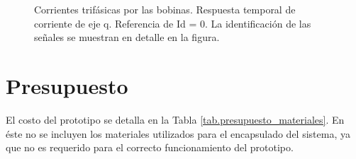 \documentclass{report}
\begin{document}
\begin{figure}[ht]
    \begin{center}
    \resizebox{10cm}{!}{\texttt{[image: 20191219\_170609\_664]}}
    \caption{Corrientes trifásicas por las bobinas. Respuesta temporal de corriente de eje q. Referencia de Id = 0. La identificación de las señales se muestran en detalle en la figura.}
    \label{fig.20191219_170609_664} 
    \end{center}
\end{figure}
\begin{comment}

\begin{table}[ht]
    \begin{minipage}{\textwidth}
    \begin{center}
    \begin{tabular}{|c|c|c|c|c|c|} \hline\hline\hline
    Canal & Color & Elemento & Amplitud (V) & Nº Espiras & Amperaje (A) \\ \hline
    1 & Amarillo & $I_{a}$ & 4.61 & 1 & 4.61 \\ \hline
    2 & Verde & $I_{b}$ & 4.69 & 1 & 4.69 \\ \hline   
    3 & Rosa & $I_{c}$ & 4.61 & 1 &  4.61\\ \hline
    6 \footnote{Medidas no disponibles}& Naranja & $I_{q}$ & - & - &  -\\ \hline
    9 \footnote{Medidas no disponibles}& Azul Oscuro & $I_{q}^{ref}$ & - & - & - \\ \hline


    \end{tabular}
    \end{center}
    \caption{Tabla con los datos de la Fig. \ref{fig.20191219_170609_664}) con las corrientes trifásicas.} \label{tab.20191219_170609_664}
\end{minipage}
\end{table}
\end{comment}

\clearpage

\newpage
\chapter{Presupuesto} \label{sec.presupuesto}

El costo del prototipo se detalla en la Tabla \ref{tab.presupuesto_materiales}. En éste no se incluyen los materiales utilizados para el encapsulado del sistema, ya que no es requerido para el correcto funcionamiento del prototipo.
\end{document}
